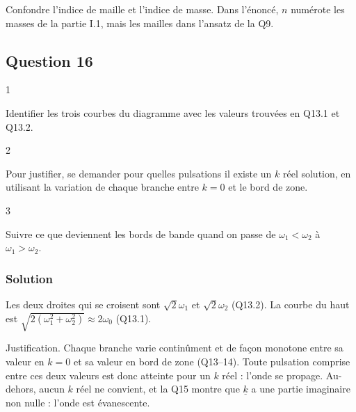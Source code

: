\documentclass[11pt,a4paper]{article}
\begin{document}
\begin{piege}

Confondre l'indice de maille et l'indice de masse. Dans l'énoncé, \(n\) numérote les masses de la partie I.1, mais les mailles dans l'ansatz de la Q9.

\end{piege}

\hypertarget{question-16}{%
\subsection{Question 16}\label{question-16}}

\begin{indication}{1}

Identifier les trois courbes du diagramme avec les valeurs trouvées en Q13.1 et Q13.2.

\end{indication}

\begin{indication}{2}

Pour justifier, se demander pour quelles pulsations il existe un \(k\) réel solution, en utilisant la variation de chaque branche entre \(k=0\) et le bord de zone.

\end{indication}

\begin{indication}{3}

Suivre ce que deviennent les bords de bande quand on passe de \(\omega_1<\omega_2\) à \(\omega_1>\omega_2\).

\end{indication}

\hypertarget{solution-24}{%
\subsubsection{Solution}\label{solution-24}}

Les deux droites qui se croisent sont \(\sqrt2\omega_1\) et \(\sqrt2\omega_2\) (Q13.2). La courbe du haut est \(\sqrt{2(\omega_1^2+\omega_2^2)}\approx2\omega_0\) (Q13.1).

Justification. Chaque branche varie continûment et de façon monotone entre sa valeur en \(k=0\) et sa valeur en bord de zone (Q13--14). Toute pulsation comprise entre ces deux valeurs est donc atteinte pour un \(k\) réel : l'onde se propage. Au-dehors, aucun \(k\) réel ne convient, et la Q15 montre que \(\underline k\) a une partie imaginaire non nulle : l'onde est évanescente.
\end{document}
